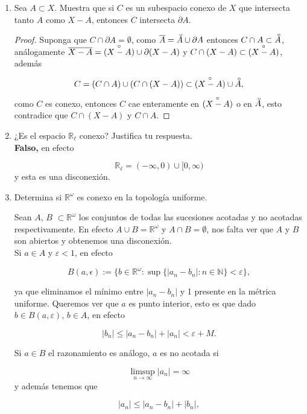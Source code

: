 \documentclass[11pt]{article}
\newcommand{\interior}[1]{\accentset{\smash{\raisebox{-0.12ex}{$\scriptstyle\circ$}}}{#1}\rule{0pt}{2.3ex}}
\begin{document}
\begin{enumerate}
    \item Sea $A \subset X$. Muestra que si $C$ es un subespacio conexo de $X$ que intersecta tanto $A$ como $X - A$, entonces $C$ intersecta $\partial A$.

    \begin{proof}
        Suponga que $C\cap \partial A=\emptyset$, como $\overline{A}=\interior{A}\cup \partial A$ entonces $C\cap A\subset \interior{A}$, análogamente $\overline{X-A}=\interior{(X-A)}\cup \partial (X-A)$  y $C\cap (X-A)\subset \interior{(X-A)}$, además

        $$C=(C\cap A) \cup (C\cap (X-A))\subset \interior{(X-A)}\cup \interior{A},$$

        como $C$ es conexo, entonces $C$ cae enteramente en $\interior{(X-A)}$ o en $\interior{A}$, esto contradice que $C\cap (X-A)$ y $C\cap A$.
    \end{proof}
    
    \item ¿Es el espacio $\mathbb{R}_\ell$ conexo? Justifica tu respuesta.\\
    
    \textbf{Falso,} en efecto 

    $$\mathbb{R}_{\ell}=(-\infty,0)\cup [0,\infty)$$
     y esta es una disconexión.

    \item Determina si $\mathbb{R}^\omega$ es conexo en la topología uniforme.


Sean $A$, $B$ $\subset\mathbb{R}^\omega$ los conjuntos de todas las sucesiones acotadas y  no acotadas respectivamente. En efecto $A \cup B = \mathbb{R}^\omega$ y $A \cap B = \emptyset$, nos falta ver que $A$ y $B$ son abiertos y obtenemos una disconexión.\\

Si $a \in A$ y $\varepsilon<1$, en efecto

$$B(a,\epsilon):=\{b\in\mathbb{R}^{\omega}:\sup\{|a_n-b_n|:n\in\mathbb{N}\}<\varepsilon\},$$

ya que eliminamos el mínimo entre $|a_n-b_n|$ y 1 presente en la métrica uniforme. Queremos ver que $a$ es punto interior, esto es que dado $b\in B(a,\varepsilon)$, $b\in A$, en efecto

$$|b_n|\leq |a_n-b_n|+|a_n|<\varepsilon+M.$$

Si $a\in B$ el razonamiento es análogo, $a$ es no acotada si

$$\limsup_{n \to \infty}|a_n|=\infty$$
 y además tenemos que 

 $$|a_n|\leq |a_n-b_n|+|b_n|,$$


\end{enumerate}
\end{document}
